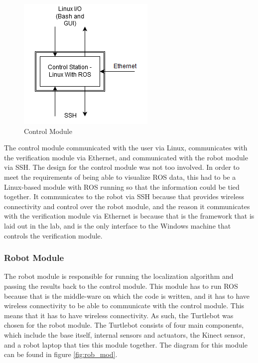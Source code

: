\documentclass{article}
\newcommand\tab[1][0.5cm]{\hspace*{#1}}
\newcounter{subsubsubsection}[subsubsection]
\begin{document}
\begin{figure}[h!]
\centering
\includegraphics[scale=0.70]{control_module.PNG}
\caption{Control Module}
\label{fig:cont_mod}
\end{figure}

The control module communicated with the user via Linux, communicates with the verification module via Ethernet, and communicated with the robot module via SSH.
\tab The design for the control module was not too involved. In order to meet the requirements of being able to visualize ROS data, this had to be a Linux-based module with ROS running so that the information could be tied together. It communicates to the robot via SSH because that provides wireless connectivity and control over the robot module, and the reason it communicates with the verification module via Ethernet is because that is the framework that is laid out in the lab, and is the only interface to the Windows machine that controls the verification module.
\subsubsection{Robot Module}
\tab The robot module is responsible for running the localization algorithm and passing the results back to the control module. This module has to run ROS because that is the middle-ware on which the code is written, and it has to have wireless connectivity to be able to communicate with the control module. This means that it has to have wireless connectivity. As such, the Turtlebot was chosen for the robot module. The Turtlebot consists of four main components, which include the base itself, internal sensors and actuators, the Kinect sensor, and a robot laptop that ties this module together. The diagram for this module can be found in figure \ref{fig:rob_mod}.\\
\end{document}
